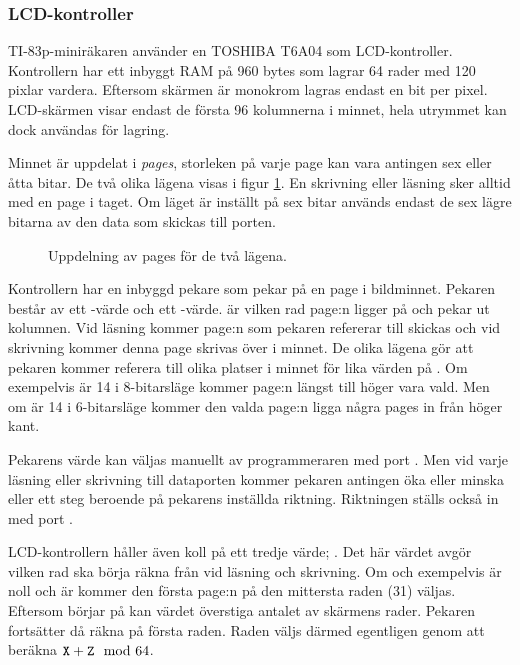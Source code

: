 \documentclass[main.tex]{subfiles}
\begin{document}
\subsubsection{LCD-kontroller}
TI-83p-miniräkaren använder en TOSHIBA T6A04 som LCD-kontroller. Kontrollern
har ett inbyggt RAM på 960 bytes som lagrar 64 rader med 120 pixlar vardera.
Eftersom skärmen är monokrom lagras endast en bit per pixel. LCD-skärmen visar
endast de första 96 kolumnerna i minnet, hela utrymmet kan dock användas för
lagring.

Minnet är uppdelat i {\it pages}, storleken på varje page kan vara antingen sex
eller åtta bitar. De två olika lägena visas i figur \ref{fig:lcdpages}. En
skrivning eller läsning sker alltid med en page i taget. Om läget är inställt
på sex bitar används endast de sex lägre bitarna av den data som skickas till
porten.

\begin{figure}[b]
    \centering
    
    \caption{Uppdelning av pages för de två lägena.}
    \label{fig:lcdpages}
\end{figure}

Kontrollern har en inbyggd pekare som pekar på en page i bildminnet. Pekaren
består av ett -värde och ett -värde.  är vilken rad
page:n ligger på och  pekar ut kolumnen. Vid läsning kommer page:n som
pekaren refererar till skickas och vid skrivning kommer denna page skrivas över
i minnet. De olika lägena gör att pekaren kommer referera till olika platser i
minnet för lika värden på . Om  exempelvis är 14 i 8-bitarsläge
kommer page:n längst till höger vara vald. Men om  är 14 i 6-bitarsläge
kommer den valda page:n ligga några pages in från höger kant.

Pekarens värde kan väljas manuellt av programmeraren med port . Men
vid varje läsning eller skrivning till dataporten  kommer pekaren
antingen öka eller minska  eller  ett steg beroende på pekarens
inställda riktning. Riktningen ställs också in med port .

LCD-kontrollern håller även koll på ett tredje värde; . Det här värdet
avgör vilken rad  ska börja räkna från vid läsning och skrivning. Om
 och  exempelvis är noll och  är  kommer den
första page:n på den mittersta raden (31) väljas. Eftersom  börjar på
 kan värdet överstiga antalet av skärmens rader. Pekaren fortsätter då
räkna på första raden. Raden väljs därmed egentligen genom att beräkna
$\texttt{X}+\texttt{Z} \mod 64$.
\end{document}
